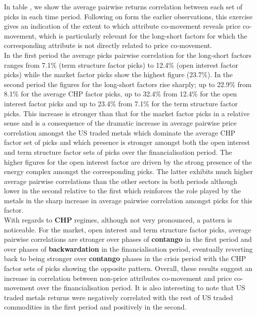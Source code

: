 \documentclass[
  authoryear,
  preprint,
  3p]{elsarticle}
\begin{document}
In table , we show the average pairwise returns correlation between each
set of picks in each time period. Following on form the earlier
observations, this exercise gives an indication of the extent to which
attribute co-movement reveals price co-movement, which is particularly
relevant for the long-short factors for which the corresponding
attribute is not directly related to price co-movement.\\
In the first period the average picks pairwise correlation for the
long-short factors ranges from 7.1\% (term structure factor picks) to
12.4\% (open interest factor picks) while the market factor picks show
the highest figure (23.7\%). In the second period the figures for the
long-short factors rise sharply; up to 22.9\% from 8.1\% for the average
CHP factor picks, up to 32.4\% from 12.4\% for the open interest factor
picks and up to 23.4\% from 7.1\% for the term structure factor picks.
This increase is stronger than that for the market factor picks in a
relative sense and is a consequence of the dramatic increase in average
pairwise price correlation amongst the US traded metals which dominate
the average CHP factor set of picks and which presence is stronger
amongst both the open interest and term structure factor sets of picks
over the financialisation period. The higher figures for the open
interest factor are driven by the strong presence of the energy complex
amongst the corresponding picks. The latter exhibits much higher average
pairwise correlations than the other sectors in both periods although
lower in the second relative to the first which reinforces the role
played by the metals in the sharp increase in average pairwise
correlation amongst picks for this factor.\\
With regards to \textbf{CHP} regimes, although not very pronounced, a
pattern is noticeable. For the market, open interest and term structure
factor picks, average pairwise correlations are stronger over phases of
\textbf{contango} in the first period and over phases of
\textbf{backwardation} in the financialisation period, eventually
reverting back to being stronger over \textbf{contango} phases in the
crisis period with the CHP factor sets of picks showing the opposite
pattern. Overall, these results suggest an increase in correlation
between non-price attributes co-movement and price co-movement over the
financialisation period. It is also interesting to note that US traded
metals returns were negatively correlated with the rest of US traded
commodities in the first period and positively in the second.
\end{document}

